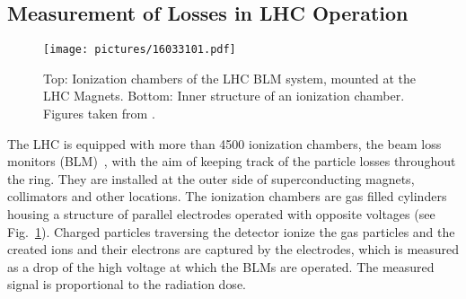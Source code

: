 \subsection{Measurement of Losses in LHC Operation} \label{chap:lossmeas}
%
\begin{figure}[htbp]  
    \centering
    \texttt{[image: pictures/16033101.pdf]}
    \caption{Top: Ionization chambers of the LHC BLM system, mounted at the LHC Magnets. Bottom: Inner structure of an ionization chamber. Figures taken from \cite{BLM_homepage}.}  
    \label{pic:16033101}
\end{figure}

The LHC is equipped with more than 4500 ionization chambers, the beam loss monitors (BLM)~\cite{BLMref1,BLMref02}, with the aim of keeping track of the particle losses throughout the ring. They are installed at the outer side of superconducting magnets, collimators and other locations. The ionization chambers are gas filled cylinders housing a structure of parallel electrodes operated with opposite voltages (see Fig.~\ref{pic:16033101}). Charged particles traversing the detector ionize the gas particles and the created ions and their electrons are captured by the electrodes, which is measured as a drop of the high voltage at which the BLMs are operated. The measured signal is proportional to the radiation dose.
%



%
%


